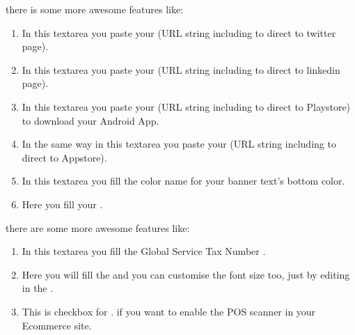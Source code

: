 \documentclass[a4paper,10pt,english]{report}
\begin{document}
there is some more awesome features like:
\begin{enumerate}
\def\theenumi{\arabic{enumi}}
\def\labelenumi{\theenumi .}
\makeatletter\def\p@enumii{\p@enumi \theenumi .}\makeatother
\setcounter{enumi}{5}
\item {} 
In this textarea you paste your  (URL string including  to direct to twitter page).

\item {} 
In this textarea you paste your  (URL string including  to direct to linkedin page).

\item {} 
In this textarea you paste your  (URL string including  to direct to Playstore) to download your Android App.

\item {} 
In the same way in this textarea you paste your  (URL string including  to direct to Appstore).

\item {} 
In this textarea you fill the color name for your banner text’s bottom color.

\item {} 
Here you fill your .

\end{enumerate}

\begin{figure}[htbp]
\centering

\noindent{}
\end{figure}

there are some more awesome features like:
\begin{enumerate}
\def\theenumi{\arabic{enumi}}
\def\labelenumi{\theenumi .}
\makeatletter\def\p@enumii{\p@enumi \theenumi .}\makeatother
\setcounter{enumi}{11}
\item {} 
In this textarea you fill the Global Service Tax Number .

\item {} 
Here you will fill the  and you can customise the font size too, just by editing in the .

\item {} 
This is checkbox for . if you want to enable the POS scanner in your Ecommerce site.

\end{enumerate}
\end{document}
